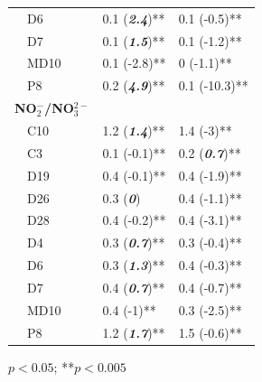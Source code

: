 \documentclass[journal = esthag, manuscript = article]{achemso}\usepackage[]{graphicx}\usepackage[]{color}
\begin{document}
\begin{table}[!tbp]
\begin{center}
\begin{tabular}{lll}
~~D6&0.1 \footnotesize{(\textit{\textbf{2.4}})**}&0.1 \footnotesize{(-0.5)**}\tabularnewline
~~D7&0.1 \footnotesize{(\textit{\textbf{1.5}})**}&0.1 \footnotesize{(-1.2)**}\tabularnewline
~~MD10&0.1 \footnotesize{(-2.8)**}&0 \footnotesize{(-1.1)**}\tabularnewline
~~P8&0.2 \footnotesize{(\textit{\textbf{4.9}})**}&0.1 \footnotesize{(-10.3)**}\tabularnewline
\hline
{\bfseries NO$_{2}^{-}$/NO$_{3}^{2-}$}&&\tabularnewline
~~C10&1.2 \footnotesize{(\textit{\textbf{1.4}})**}&1.4 \footnotesize{(-3)**}\tabularnewline
~~C3&0.1 \footnotesize{(-0.1)**}&0.2 \footnotesize{(\textit{\textbf{0.7}})**}\tabularnewline
~~D19&0.4 \footnotesize{(-0.1)**}&0.4 \footnotesize{(-1.9)**}\tabularnewline
~~D26&0.3 \footnotesize{(\textit{\textbf{0}})}&0.4 \footnotesize{(-1.1)**}\tabularnewline
~~D28&0.4 \footnotesize{(-0.2)**}&0.4 \footnotesize{(-3.1)**}\tabularnewline
~~D4&0.3 \footnotesize{(\textit{\textbf{0.7}})**}&0.3 \footnotesize{(-0.4)**}\tabularnewline
~~D6&0.3 \footnotesize{(\textit{\textbf{1.3}})**}&0.4 \footnotesize{(-0.3)**}\tabularnewline
~~D7&0.4 \footnotesize{(\textit{\textbf{0.7}})**}&0.4 \footnotesize{(-0.7)**}\tabularnewline
~~MD10&0.4 \footnotesize{(-1)**}&0.3 \footnotesize{(-2.5)**}\tabularnewline
~~P8&1.2 \footnotesize{(\textit{\textbf{1.7}})**}&1.5 \footnotesize{(-0.6)**}\tabularnewline
\hline
\end{tabular}\end{center}

\footnotesize *$p<0.05$; **$p<0.005$\end{table}
\end{document}

